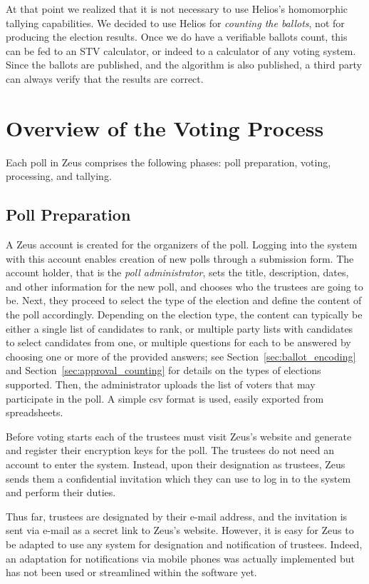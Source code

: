 \documentclass[letterpaper,10pt]{article}
\begin{document}
At that point we realized that it is not necessary to use Helios's
homomorphic tallying capabilities. We decided to use Helios for
\emph{counting the ballots}, not for producing the election results.
Once we do have a verifiable ballots count, this can be fed to an STV
calculator, or indeed to a calculator of any voting system. Since the
ballots are published, and the algorithm is also published, a third
party can always verify that the results are correct.

\section{Overview of the Voting Process}
\label{sec:voting_overview}

Each poll in Zeus comprises the following phases:
poll preparation, voting, processing, and tallying.

\subsection{Poll Preparation}
A Zeus account is created for the organizers of the poll.
Logging into the system with this account enables creation of new polls
through a submission form.
The account holder, that is the \emph{poll administrator},
sets the title, description, dates, and other information for the new
poll, and chooses who the trustees are going to be.
Next, they proceed to select the type of the election and define the
content of the poll accordingly.
Depending on the election type,
the content can typically be either a single list of candidates to rank,
or multiple party lists with candidates to select candidates from one,
or multiple questions for each to be answered by choosing one or more of
the provided answers; see Section~\ref{sec:ballot_encoding} 
and Section~\ref{sec:approval_counting} for details on the types of elections 
supported. Then, the administrator uploads the list of voters that may 
participate in the poll. A simple {\sc csv} format is used, easily 
exported from spreadsheets.

Before voting starts each of the trustees must visit Zeus's website
and generate and register their encryption keys for the poll.
The trustees do not need an account to enter the system.
Instead, upon their designation as trustees, Zeus sends them a
confidential invitation which they can use to log in to the system
and perform their duties.

Thus far, trustees are designated by their e-mail address, and the
invitation is sent via e-mail as a secret link to Zeus's website.
However, it is easy for Zeus to be adapted to use any system for
designation and notification of trustees. Indeed, an adaptation 
for notifications via mobile phones was actually implemented but
has not been used or streamlined within the software yet.
\end{document}
